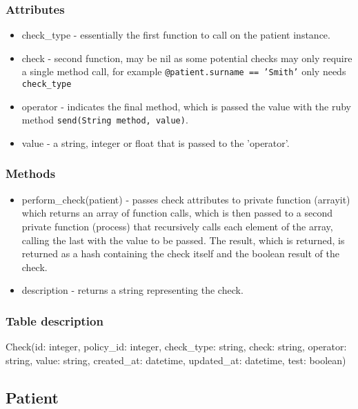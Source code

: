 \documentclass[letterpaper]{amsart}
\begin{document}
\subsubsection{Attributes}
\begin{itemize}
    \item check\_type - essentially the first function to call on the patient instance.
    \item check - second function, may be nil as some potential checks may only require a single method call, for example \texttt{@patient.surname == 'Smith'} only needs \texttt{check\_type}
    \item operator - indicates the final method, which is passed the value with the ruby method \texttt{send(String method, value)}.
    \item value - a string, integer or float that is passed to the 'operator'.
\end{itemize}

\subsubsection{Methods}
\begin{itemize}
    \item perform\_check(patient) - passes check attributes to private function (arrayit) which returns an array of function calls, which is then passed to a second private function (process) that recursively calls each element of the array, calling the last with the value to be passed.  The result, which is returned, is returned as a hash containing the check itself and the boolean result of the check. 
    \item description - returns a string representing the check.
\end{itemize}

\subsubsection{Table description}
Check(id: integer, policy\_id: integer, check\_type: string, check: string, operator: string, value: string, created\_at: datetime, updated\_at: datetime, test: boolean)

\subsection{Patient}
\end{document}
